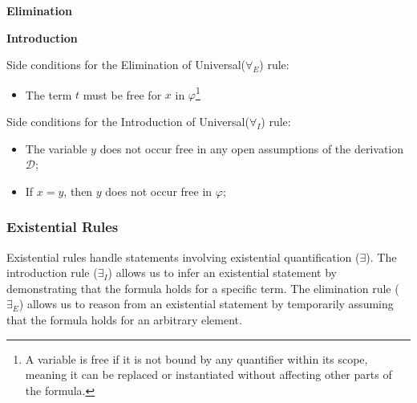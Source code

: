 \noindent
\begin{minipage}{0.48\linewidth}
\centering
\vspace{0.5cm}
\textbf{Elimination}
\begin{prooftree}
\end{prooftree}
\end{minipage}\hfill
\begin{minipage}{0.48\linewidth}
\centering
\vspace{0.5cm}
\textbf{Introduction}
\begin{prooftree}
\end{prooftree}
\end{minipage}

\vspace{0.5cm}

Side conditions for the Elimination of Universal(\(\forall_E\)) rule:
\begin{itemize}[noitemsep]
  \item The term \(t\) must be free for \(x\) in \(\varphi\)\footnote{A variable is free if it is not bound by any quantifier within its scope, meaning it can be replaced or instantiated without affecting other parts of the formula.}
\end{itemize}

Side conditions for the Introduction of Universal(\(\forall_I\)) rule:
\begin{itemize}[noitemsep]
  \item The variable \(y\) does not occur free in any open assumptions of the derivation \(\mathcal{D}\);
  \item If \(x = y\), then \(y\) does not occur free in \(\varphi\);
\end{itemize}

\subsubsection*{Existential Rules}
\label{rule:exist}
Existential rules handle statements involving existential quantification (\(\exists\)). The introduction rule (\(\exists_I\)) allows us to infer an existential statement by demonstrating that the formula holds for a specific term. The elimination rule (\(\exists_E\)) allows us to reason from an existential statement by temporarily assuming that the formula holds for an arbitrary element.


